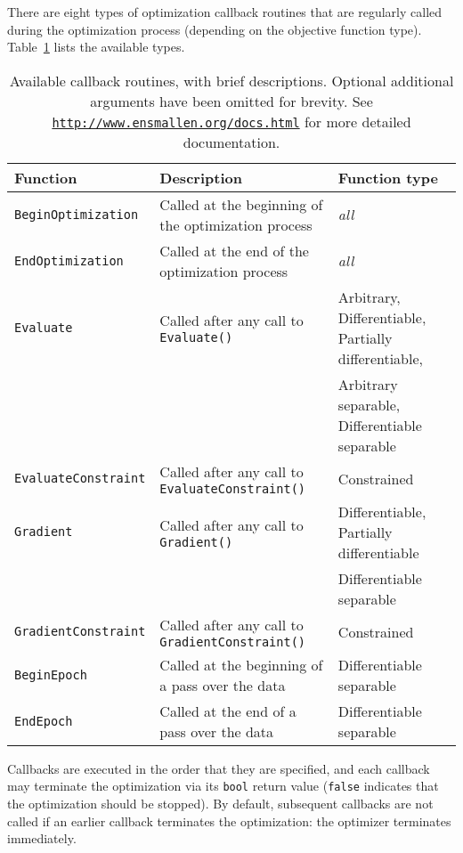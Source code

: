 There are eight types of optimization callback routines that are regularly
called during the optimization process (depending on the objective function
type).  Table~\ref{tab:callback_list} lists the available types.

\begin{table}[H]
\centering
\small
\begin{tabular}{lll}
\toprule
{\bf Function} & {\bf Description} & {\bf Function type} \\
\hline
\texttt{BeginOptimization}   & Called at the beginning of the optimization process  & {\it all} \\
\texttt{EndOptimization}     & Called at the end of the optimization process & {\it all} \\
\texttt{Evaluate}            & Called after any call to {\tt Evaluate()}            & Arbitrary, Differentiable, Partially differentiable,  \\
                             &                                                      & Arbitrary separable, Differentiable separable \\
\texttt{EvaluateConstraint}  & Called after any call to {\tt EvaluateConstraint()}  & Constrained \\
\texttt{Gradient}            & Called after any call to {\tt Gradient()}            & Differentiable, Partially differentiable \\
                             &                                                      & Differentiable separable \\
\texttt{GradientConstraint}  & Called after any call to {\tt GradientConstraint()}  & Constrained \\
\texttt{BeginEpoch}          & Called at the beginning of a pass over the data      & Differentiable separable \\
\texttt{EndEpoch}            & Called at the end of a pass over the data            & Differentiable separable \\

\bottomrule
\end{tabular}
\vspace{0.5ex}
\caption
  {
  Available callback routines, with brief descriptions.
  Optional additional arguments have been omitted for brevity.
  See {\href{http://www.ensmallen.org/docs.html}{\mbox{\tt http://www.ensmallen.org/docs.html}}} for more detailed documentation.
  }
\label{tab:callback_list}
\end{table}

Callbacks are executed in the order that they are specified, and each callback
may terminate the optimization via its {\tt bool} return value ({\tt false}
indicates that the optimization should be stopped).  By default, subsequent
callbacks are not called if an earlier callback terminates the optimization: the
optimizer terminates immediately.

